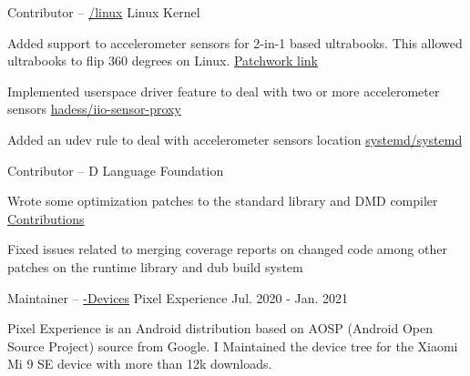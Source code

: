 \begin{cventries}
  \cventry
    {Contributor -- \href{https://github.com/torvalds/linux/}{\faGithubSquare\acvHeaderIconSep\@torvalds/linux}} %
    {Linux Kernel} %
    {} %
    {} %
    {
      \begin{cvitems} %
        \item {Added support to accelerometer sensors for 2-in-1 based ultrabooks. This allowed ultrabooks to flip 360 degrees on Linux. \hfill \href{https://patchwork.kernel.org/patch/10882031/}{Patchwork link}}
        \item {Implemented userspace driver feature to deal with two or more accelerometer sensors \hfill \href{https://github.com/hadess/iio-sensor-proxy/pull/262}{hadess/iio-sensor-proxy\acvHeaderIconSep\@\faGithubSquare}}
        \item{Added an udev rule to deal with accelerometer sensors location \hfill \href{https://github.com/systemd/systemd/pull/12322/}{systemd/systemd\acvHeaderIconSep\@\faGithubSquare}}
      \end{cvitems}
    }

  \cventry
    {Contributor --
    \href{https://github.com/dlang}{\faGithubSquare\acvHeaderIconSep\@dlang}} %
    {D Language Foundation} %
    {} %
    {} %
    {
      \begin{cvitems} %
        \item {Wrote some optimization patches to the standard library and DMD compiler\hfill 
        \href{https://github.com/pulls?q=is\%3Apr+author\%3Aljmf00+is\%3Aclosed+org\%3Adlang+}{Contributions \acvHeaderIconSep\@\faGithubSquare}}
        \item {Fixed issues related to merging coverage reports on changed code among other patches on the runtime library and dub build system}
      \end{cvitems}
    }
    
  \cventry
    {Maintainer --
    \href{https://github.com/PixelExperience-Devices}{\faGithubSquare\acvHeaderIconSep\@PixelExperience-Devices}} %
    {Pixel Experience} %
    {} %
    {Jul. 2020 - Jan. 2021} %
    {
      \begin{cvitems} %
        \item {Pixel Experience is an Android distribution based on AOSP (Android Open Source Project) source from Google. I Maintained the device tree for the Xiaomi Mi 9 SE device with more than 12k downloads.}
      \end{cvitems}
    }


\end{cventries}

